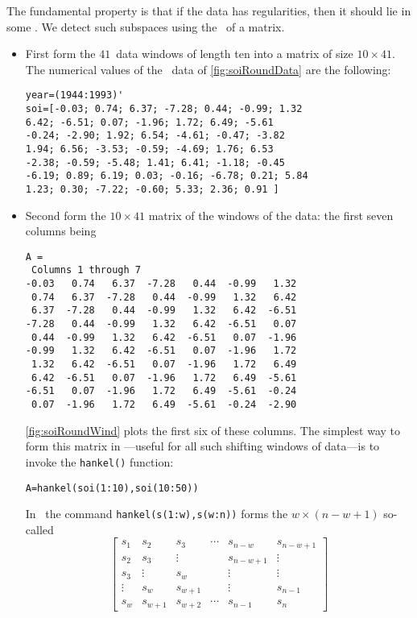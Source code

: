 \begin{example}
The fundamental property is that if the data has regularities, then it should lie in some .
We detect such subspaces using the \svd\ of a matrix.
\begin{itemize}
\item First form the \(41\)~data windows of length ten into a matrix of size \(10\times 41\).
The numerical values of the \soi\ data of \cref{fig:soiRoundData} are the following:
\begin{verbatim}
year=(1944:1993)'
soi=[-0.03; 0.74; 6.37; -7.28; 0.44; -0.99; 1.32
6.42; -6.51; 0.07; -1.96; 1.72; 6.49; -5.61
-0.24; -2.90; 1.92; 6.54; -4.61; -0.47; -3.82
1.94; 6.56; -3.53; -0.59; -4.69; 1.76; 6.53
-2.38; -0.59; -5.48; 1.41; 6.41; -1.18; -0.45
-6.19; 0.89; 6.19; 0.03; -0.16; -6.78; 0.21; 5.84
1.23; 0.30; -7.22; -0.60; 5.33; 2.36; 0.91 ] 
\end{verbatim}

\item Second form the \(10\times41\) matrix of the windows of the data: the first seven columns being
\begin{verbatim}
A =
 Columns 1 through 7
-0.03   0.74   6.37  -7.28   0.44  -0.99   1.32
 0.74   6.37  -7.28   0.44  -0.99   1.32   6.42
 6.37  -7.28   0.44  -0.99   1.32   6.42  -6.51
-7.28   0.44  -0.99   1.32   6.42  -6.51   0.07
 0.44  -0.99   1.32   6.42  -6.51   0.07  -1.96
-0.99   1.32   6.42  -6.51   0.07  -1.96   1.72
 1.32   6.42  -6.51   0.07  -1.96   1.72   6.49
 6.42  -6.51   0.07  -1.96   1.72   6.49  -5.61
-6.51   0.07  -1.96   1.72   6.49  -5.61  -0.24
 0.07  -1.96   1.72   6.49  -5.61  -0.24  -2.90
\end{verbatim}
\cref{fig:soiRoundWind} plots the first six of these columns.
The simplest way to form this matrix in \script---useful for all such shifting windows of data---is to invoke the \verb|hankel()| function:
\begin{verbatim}
A=hankel(soi(1:10),soi(10:50))
\end{verbatim}
In \script\ the command \verb|hankel(s(1:w),s(w:n))| forms the \(w\times(n-w+1)\) so-called 
\begin{equation*}
\begin{bmatrix} s_1&s_2&s_3&\cdots&s_{n-w}&s_{n-w+1}
\\s_2&s_3&\vdots&&s_{n-w+1}&\vdots
\\s_3&\vdots&s_w&&\vdots&\vdots
\\\vdots&s_w&s_{w+1}&&\vdots&s_{n-1}
\\s_w&s_{w+1}&s_{w+2}&\cdots&s_{n-1}&s_n \end{bmatrix}
\end{equation*}


\end{itemize}
\end{example}
